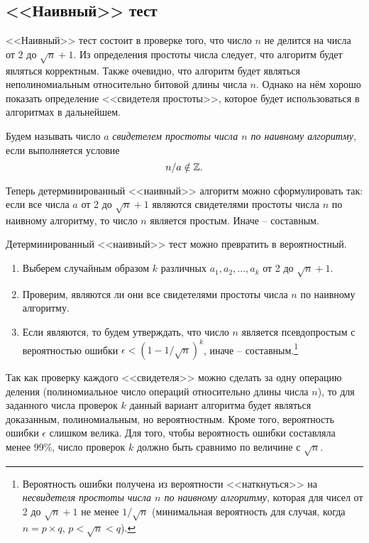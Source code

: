 \subsection{<<Наивный>> тест}\label{section-prime-check-naive}

<<Наивный>> тест состоит в проверке того, что число $n$ не делится на числа от $2$ до $\sqrt{n}+1$. Из определения простоты числа следует, что алгоритм будет являться корректным. Также очевидно, что алгоритм будет являться неполиномиальным относительно битовой длины числа $n$. Однако на нём хорошо показать определение <<свидетеля простоты>>, которое будет использоваться в алгоритмах в дальнейшем.

Будем называть число $a$ \emph{свидетелем простоты числа $n$ по наивному алгоритму}, если выполняется условие
\[
	n / a \notin \mathbb{Z}.
\]

Теперь детерминированный <<наивный>> алгоритм можно сформулировать так: если все числа $a$ от 2 до $\sqrt{n}+1$ являются свидетелями простоты числа $n$ по наивному алгоритму, то число $n$ является простым. Иначе -- составным.

Детерминированный <<наивный>> тест можно превратить в вероятностный.

\begin{enumerate}
	\item Выберем случайным образом $k$ различных $a_1, a_2, \dots, a_k$ от 2 до $\sqrt{n}+1$.
	\item Проверим, являются ли они все свидетелями простоты числа $n$ по наивному алгоритму. 
	\item Если являются, то будем утверждать, что число $n$ является псевдопростым с вероятностью ошибки $\epsilon < \left( 1 - 1 / \sqrt{n} \right)^k$, иначе -- составным.\footnote{Вероятность ошибки получена из вероятности <<наткнуться>> на \emph{несвидетеля простоты числа $n$ по наивному алгоритму}, которая для чисел от 2 до $\sqrt{n}+1$ не менее $1 / \sqrt{n}$ (минимальная вероятность для случая, когда $n = p \times q$, $p < \sqrt{n} < q$).}
\end{enumerate}

Так как проверку каждого <<свидетеля>> можно сделать за одну операцию деления (полиномиальное число операций относительно длины числа $n$), то для заданного числа проверок $k$ данный вариант алгоритма будет являться доказанным, полиномиальным, но вероятностным. Кроме того, вероятность ошибки $\epsilon$ слишком велика. Для того, чтобы вероятность ошибки составляла менее 99\%, число проверок $k$ должно быть сравнимо по величине с $\sqrt{n}$.
